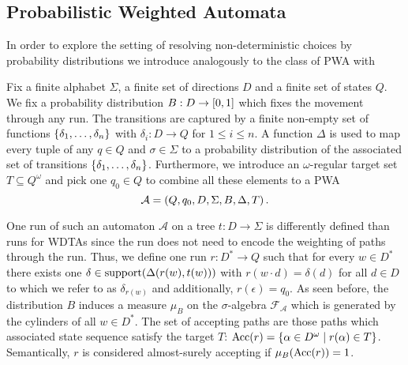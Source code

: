\subsection{Probabilistic Weighted Automata}
In order to explore the setting of resolving non-deterministic choices by
probability distributions we introduce analogously to
\cite[Definition 4.1.1]{RandAutoInfTrees} the class of \ac{PWA} with
\begin{definition}
  Fix a finite alphabet $\Sigma$, a finite set of directions $D$ and a finite
  set of states $Q$. We fix a probability distribution
  $B:D\rightarrow\left[0,1\right]$ which fixes the movement through any run. The
  transitions are captured by a finite non-empty set of functions
  $\left\{\delta_{1},\dots,\delta_{n}\right\}$ with $\delta_{i}:D\rightarrow Q$ for
  $1\leq i\leq n$. A function $\Delta$ is used to map every tuple of any
  $q\in Q$ and $\sigma\in\Sigma$ to a probability distribution of the
  associated set of transitions $\left\{\delta_{1},\dots,\delta_{n}\right\}$.
  Furthermore, we introduce an $\omega$-regular target set
  $T\subseteq Q^{\omega}$ and pick one $q_{0}\in Q$ to combine all these
  elements to a \ac{PWA}
  \begin{equation*}
    \mathcal{A} = \left(Q, q_{0}, D, \Sigma, B, \Delta, T\right).
  \end{equation*}
\end{definition}
One run of such an automaton $\mathcal{A}$ on a tree $t:D\rightarrow\Sigma$ is
differently defined than runs for \acp{WDTA} since the run does not need to
encode the weighting of paths through the run. Thus, we define one run
$r:D^{*}\rightarrow Q$ such that for every $w\in D^{*}$ there exists one
$\delta\in\operatorname{support}(\Delta(r(w), t(w)))$ with $r(w\cdot d) = \delta(d)$ for
all $d\in D$ to which we refer to as $\delta_{r(w)}$ and additionally,
$r(\epsilon) = q_{0}$. As seen before, the distribution $B$ induces a measure
$\mu_{B}$ on the $\sigma$-algebra $\mathcal{F}_{\mathcal{A}}$ which is
generated by the cylinders of all $w\in D^{*}$. The set of accepting paths are
those paths which associated state sequence satisfy the target $T$:
$\operatorname{Acc}(r)=\left\{\alpha\in D^{\omega}\mid r(\alpha)\in T\right\}$. Semantically, $r$ is
considered almost-surely accepting if $\mu_{B}(\operatorname{Acc}(r)) = 1$.

